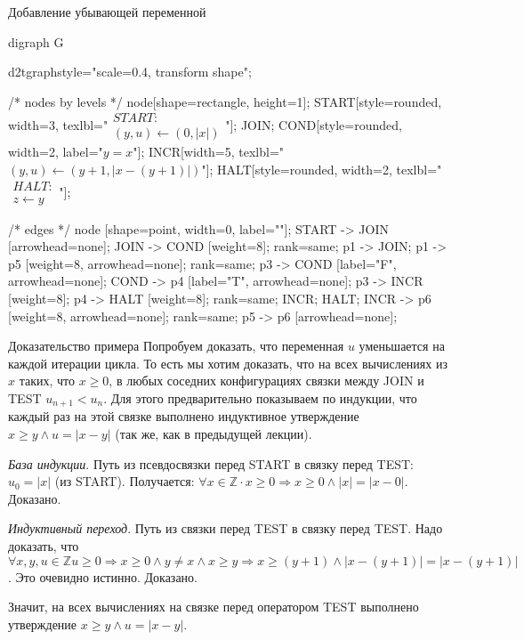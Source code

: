 \documentclass[hyperref={unicode=true}]{beamer}
\begin{document}
  	\begin{frame}[fragile]{Добавление убывающей переменной}
	\huge
	\begin{dot2tex}[options=-traw]
	digraph G{
		d2tgraphstyle="scale=0.4, transform shape";

		/* nodes by levels */
		node[shape=rectangle, height=1];
		START[style=rounded, width=3, texlbl="$\begin{matrix}START:\\ (y, u) \leftarrow (0, |x|)\end{matrix}$"];
		JOIN;
        COND[style=rounded, width=2, label="$y = x$"];
		INCR[width=5, texlbl="$(y, u) \leftarrow (y + 1, |x - (y + 1)|)$"];
        HALT[style=rounded, width=2, texlbl="$\begin{matrix}HALT:\\  z \leftarrow y\end{matrix}$"];

		/* edges */
		node [shape=point, width=0, label=""];
		START -> JOIN [arrowhead=none]; JOIN -> COND [weight=8];
		{ rank=same; p1 -> JOIN; }
		p1 -> p5 [weight=8, arrowhead=none];
		{ rank=same; p3 -> COND [label="F", arrowhead=none]; COND -> p4 [label="T", arrowhead=none]; }
		p3 -> INCR [weight=8];
		p4 -> HALT [weight=8];
		{ rank=same; INCR; HALT; }
		INCR -> p6 [weight=8, arrowhead=none];
		{ rank=same; p5 -> p6 [arrowhead=none]; }
	}
	\end{dot2tex}
	\end{frame}

    \begin{frame}{Доказательство примера}
    Попробуем доказать, что переменная $u$ уменьшается на каждой итерации цикла. То есть мы хотим доказать, что на всех вычислениях из $x$ таких, что $x \geq 0$, в любых соседних конфигурациях связки между JOIN и TEST $u_{n+1} < u_n$. Для этого предварительно показываем по индукции, что каждый раз на этой связке выполнено индуктивное утверждение $x \geq y \land u = |x-y|$ (так же, как в предыдущей лекции).

    \emph{База индукции}. Путь из псевдосвязки перед START в связку перед TEST: $u_0 = |x|$ (из START). Получается: $\forall x \in \mathbb{Z} \cdot x \geq 0 \Rightarrow x \geq 0 \land |x| = |x - 0|$. Доказано.

    \emph{Индуктивный переход}. Путь из связки перед TEST в связку перед TEST. Надо доказать, что $\forall x, y, u \in \mathbb{Z} u \geq 0 \Rightarrow x \geq 0 \land y \neq x \land x \geq y \Rightarrow x \geq (y + 1) \land |x - (y + 1)| = |x - (y + 1)|$. Это очевидно истинно. Доказано.

    Значит, на всех вычислениях на связке перед оператором TEST выполнено утверждение $x \geq y \land u = |x - y|$.
    \end{frame}
\end{document}
